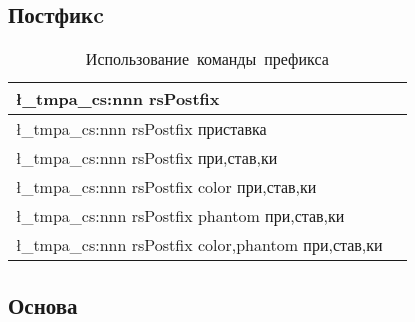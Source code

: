 \ExplSyntaxOff{}


\subsection{Постфикc}

\ExplSyntaxOn{}

\begin{tcolorbox}
\end{tcolorbox}

\renewcommand{\arraystretch}{1.125}
\begin{table}[ht!]
    \centering
    \begin{tabular}{@{}ll@{}}
        \toprule
        \l_tmpa_cs:nnn { rsPostfix } {} { }                          \\ \midrule
        \l_tmpa_cs:nnn { rsPostfix } {} { приставка }                \\ \midrule
        \l_tmpa_cs:nnn { rsPostfix } {} { при,став,ки }              \\ \midrule
        \l_tmpa_cs:nnn { rsPostfix } {color} { при,став,ки }         \\ \midrule
        \l_tmpa_cs:nnn { rsPostfix } {phantom} { при,став,ки }       \\ \midrule
        \l_tmpa_cs:nnn { rsPostfix } {color,phantom} { при,став,ки } \\ \midrule
        \bottomrule
    \end{tabular}
    \caption{Использование~команды~префикса}
\end{table}

\ExplSyntaxOff{}



\subsection{Основа}

\ExplSyntaxOn{}

\begin{tcolorbox}
\end{tcolorbox}


